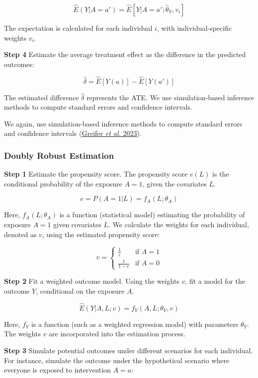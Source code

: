 \documentclass[
  singlecolumn]{article}
\begin{document}
\[\hat{E}(Y|A=a')  = \hat{E}[Y|A=a'; \hat{\theta}_Y,  v_i]\]

The expectation is calculated for each individual \(i\), with
individual-specific weights \(v_i\).

\textbf{Step 4} Estimate the average treatment effect as the difference
in the predicted outcomes:

\[\hat{\delta} = \hat{E}[Y(a)] - \hat{E}[Y(a')]\]

The estimated difference \(\hat{\delta}\) represents the ATE. We use
simulation-based inference methods to compute standard errors and
confidence intervals.

We again, use simulation-based inference methods to compute standard
errors and confidence intervals
(\protect\hyperlink{ref-greifer2023}{Greifer \emph{et al.} 2023}).

\hypertarget{doubly-robust-estimation}{%
\subsubsection{Doubly Robust
Estimation}\label{doubly-robust-estimation}}

\textbf{Step 1} Estimate the propensity score. The propensity score
\(e(L)\) is the conditional probability of the exposure \(A = 1\), given
the covariates \(L\).

\[e = P(A = 1 | L) = f_A(L; \theta_A)\]

Here, \(f_A(L; \theta_A)\) is a function (statistical model) estimating
the probability of exposure \(A = 1\) given covariates \(L\). We
calculate the weights for each individual, denoted as \(v\), using the
estimated propensity score:

\[
v = 
\begin{cases} 
\frac{1}{e} & \text{if } A = 1 \\
\frac{1}{1-e} & \text{if } A = 0 
\end{cases}
\]

\textbf{Step 2} Fit a weighted outcome model. Using the weights \(v\),
fit a model for the outcome \(Y\), conditional on the exposure \(A\).

\[ \hat{E}(Y|A, L; v) = f_Y(A, L ; \theta_Y, v) \]

Here, \(f_Y\) is a function (such as a weighted regression model) with
parameters \(\theta_Y\). The weights \(v\) are incorporated into the
estimation process.

\textbf{Step 3} Simulate potential outcomes under different scenarios
for each individual. For instance, simulate the outcome under the
hypothetical scenario where everyone is exposed to intervention \(A=a\):
\end{document}
